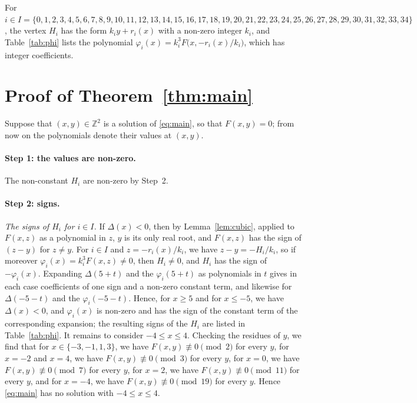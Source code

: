 \documentclass[11pt]{article}
\newcommand{\Z}{\mathbb{Z}}
\begin{document}
For $i\in I=\{0,\allowbreak 1,\allowbreak 2,\allowbreak 3,\allowbreak 4,\allowbreak 5,\allowbreak 6,\allowbreak 7,\allowbreak 8,\allowbreak 9,\allowbreak 10,\allowbreak 11,\allowbreak 12,\allowbreak 13,\allowbreak 14,\allowbreak 15,\allowbreak 16,\allowbreak 17,\allowbreak 18,\allowbreak 19,\allowbreak 20,\allowbreak 21,\allowbreak 22,\allowbreak 23,\allowbreak 24,\allowbreak 25,\allowbreak 26,\allowbreak 27,\allowbreak 28,\allowbreak 29,\allowbreak 30,\allowbreak 31,\allowbreak 32,\allowbreak 33,\allowbreak 34\}$, the vertex $H_i$ has the form $k_iy+r_i(x)$ with a non-zero integer $k_i$, and Table~\ref{tab:phi} lists the polynomial $\varphi_i(x)=k_i^3F\bigl(x,-r_i(x)/k_i\bigr)$, which has integer coefficients.

\section{Proof of Theorem~\ref{thm:main}}

Suppose that $(x,y)\in\Z^2$ is a solution of \eqref{eq:main}, so that $F(x,y)=0$; from now on the polynomials denote their values at $(x,y)$.
\paragraph{Step 1: the values are non-zero.} The non-constant $H_i$ are non-zero by Step~2.

\paragraph{Step 2: signs.} \emph{The signs of $H_i$ for $i\in I$.} If $\Delta(x)<0$, then by Lemma~\ref{lem:cubic}, applied to $F(x,z)$ as a polynomial in $z$, $y$ is its only real root, and $F(x,z)$ has the sign of $(z-y)$ for $z\neq y$. For $i\in I$ and $z=-r_i(x)/k_i$, we have $z-y=-H_i/k_i$, so if moreover $\varphi_i(x)=k_i^3F(x,z)\neq0$, then $H_i\neq0$, and $H_i$ has the sign of $-\varphi_i(x)$. Expanding $\Delta(5+t)$ and the $\varphi_i(5+t)$ as polynomials in $t$ gives in each case coefficients of one sign and a non-zero constant term, and likewise for $\Delta(-5-t)$ and the $\varphi_i(-5-t)$. Hence, for $x\geq5$ and for $x\leq-5$, we have $\Delta(x)<0$, and $\varphi_i(x)$ is non-zero and has the sign of the constant term of the corresponding expansion; the resulting signs of the $H_i$ are listed in Table~\ref{tab:phi}. It remains to consider $-4\leq x\leq4$. Checking the residues of $y$, we find that for $x\in\{-3,\allowbreak -1,\allowbreak 1,\allowbreak 3\}$, we have $F(x,y)\not\equiv0\pmod{2}$ for every $y$, for $x=-2$ and $x=4$, we have $F(x,y)\not\equiv0\pmod{3}$ for every $y$, for $x=0$, we have $F(x,y)\not\equiv0\pmod{7}$ for every $y$, for $x=2$, we have $F(x,y)\not\equiv0\pmod{11}$ for every $y$, and for $x=-4$, we have $F(x,y)\not\equiv0\pmod{19}$ for every $y$. Hence \eqref{eq:main} has no solution with $-4\leq x\leq4$.
\end{document}
